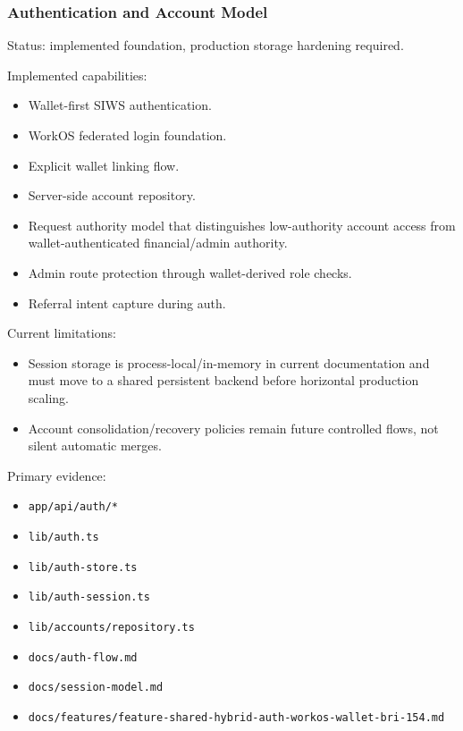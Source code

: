 \documentclass[
  10pt,
  letterpaper,
]{article}
\providecommand{\tightlist}{%
  \setlength{\itemsep}{0pt}\setlength{\parskip}{0pt}}
\let\oldtexttt\texttt
\renewcommand{\texttt}[1]{\oldtexttt{\small #1}}
\begin{document}
\subsubsection{Authentication and Account
Model}\label{authentication-and-account-model}

Status: implemented foundation, production storage hardening required.

Implemented capabilities:

\begin{itemize}
\tightlist
\item
  Wallet-first SIWS authentication.
\item
  WorkOS federated login foundation.
\item
  Explicit wallet linking flow.
\item
  Server-side account repository.
\item
  Request authority model that distinguishes low-authority account
  access from wallet-authenticated financial/admin authority.
\item
  Admin route protection through wallet-derived role checks.
\item
  Referral intent capture during auth.
\end{itemize}

Current limitations:

\begin{itemize}
\tightlist
\item
  Session storage is process-local/in-memory in current documentation
  and must move to a shared persistent backend before horizontal
  production scaling.
\item
  Account consolidation/recovery policies remain future controlled
  flows, not silent automatic merges.
\end{itemize}

Primary evidence:

\begin{itemize}
\tightlist
\item
  \texttt{app/api/auth/*}
\item
  \texttt{lib/auth.ts}
\item
  \texttt{lib/auth-store.ts}
\item
  \texttt{lib/auth-session.ts}
\item
  \texttt{lib/accounts/repository.ts}
\item
  \texttt{docs/auth-flow.md}
\item
  \texttt{docs/session-model.md}
\item
  \texttt{docs/features/feature-shared-hybrid-auth-workos-wallet-bri-154.md}
\end{itemize}
\end{document}
